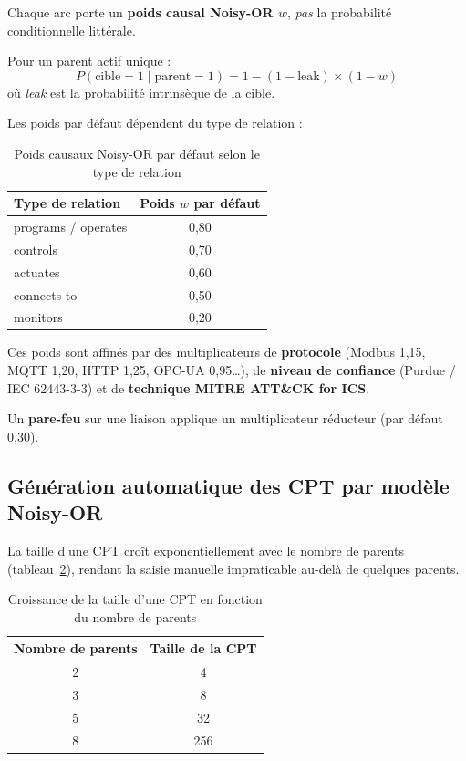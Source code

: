 \documentclass[12pt,a4paper]{article}
\newcommand{\forcereset}[1]{}
\begin{document}
Chaque arc porte un \textbf{poids causal Noisy-OR $w$}, \emph{pas} la probabilité conditionnelle littérale.

Pour un parent actif unique :
\[
P(\text{cible}=1 \mid \text{parent}=1) = 1 - (1 - \text{leak}) \times (1 - w)
\]
où \emph{leak} est la probabilité intrinsèque de la cible.

Les poids par défaut dépendent du type de relation :

\begin{table}[H]
\centering
\caption{Poids causaux Noisy-OR par défaut selon le type de relation}
\label{tab:propagation}
\begin{tabular}{lc}
\toprule
\textbf{Type de relation} & \textbf{Poids $w$ par défaut} \\
\midrule
programs / operates & 0,80 \\
controls & 0,70 \\
actuates & 0,60 \\
connects-to & 0,50 \\
monitors & 0,20 \\
\bottomrule
\end{tabular}
\end{table}

Ces poids sont affinés par des multiplicateurs de \textbf{protocole} (Modbus 1,15, MQTT 1,20, HTTP 1,25, OPC-UA 0,95\ldots), de \textbf{niveau de confiance} (Purdue / IEC 62443-3-3) et de \textbf{technique MITRE ATT\&CK for ICS}.

Un \textbf{pare-feu} sur une liaison applique un multiplicateur réducteur (par défaut 0,30).

\subsection{Génération automatique des CPT par modèle Noisy-OR}
\forcereset{5}

La taille d'une CPT croît exponentiellement avec le nombre de parents (tableau~\ref{tab:cptsize}), rendant la saisie manuelle impraticable au-delà de quelques parents.

\begin{table}[H]
\centering
\caption{Croissance de la taille d'une CPT en fonction du nombre de parents}
\label{tab:cptsize}
\begin{tabular}{cc}
\toprule
\textbf{Nombre de parents} & \textbf{Taille de la CPT} \\
\midrule
2 & 4 \\
3 & 8 \\
5 & 32 \\
8 & 256 \\
\bottomrule
\end{tabular}
\end{table}
\end{document}
